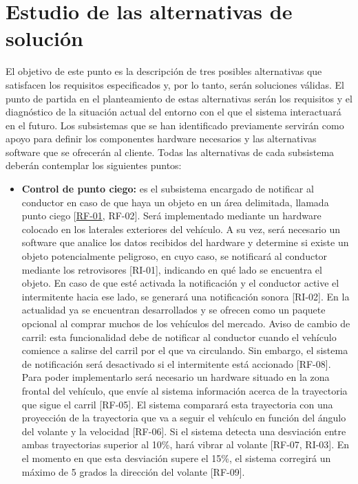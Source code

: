 \section{Estudio de las alternativas de solución}
El objetivo de este punto es la descripción de tres posibles alternativas que satisfacen los requisitos especificados y, por lo tanto, serán soluciones válidas. El punto de partida en el planteamiento de estas alternativas serán los requisitos y el diagnóstico de la situación actual del entorno con el que el sistema interactuará en el futuro. Los subsistemas que se han identificado previamente servirán como apoyo para definir los componentes hardware necesarios y las alternativas software que se ofrecerán al cliente. Todas las alternativas de cada subsistema deberán contemplar los siguientes puntos:

\begin{itemize}[-]
\item \textbf{Control de punto ciego:} es el subsistema encargado de notificar al conductor en caso de que haya un objeto en un área delimitada, llamada punto ciego [\hyperref[tab:RF-01]{RF-01}, RF-02]. Será implementado mediante un hardware colocado en los laterales exteriores del vehículo. A su vez, será necesario un software que analice los datos recibidos del hardware y determine si existe un objeto potencialmente peligroso, en cuyo caso, se notificará al conductor mediante los retrovisores [RI-01], indicando en qué lado se encuentra el objeto. En caso de que esté activada la notificación y el conductor active el intermitente hacia ese lado, se generará una notificación sonora [RI-02]. En la actualidad ya se encuentran desarrollados y se ofrecen como un paquete opcional al comprar muchos de los vehículos del mercado.
Aviso de cambio de carril: esta funcionalidad debe de notificar al conductor cuando el vehículo comience a salirse del carril por el que va circulando. Sin embargo, el sistema de notificación será desactivado si el intermitente está accionado [RF-08]. Para poder implementarlo será necesario un hardware situado en la zona frontal del vehículo, que envíe al sistema información acerca de la trayectoria que sigue el carril [RF-05].  El sistema comparará esta trayectoria con una proyección de la trayectoria que va a seguir el vehículo en función del ángulo del volante y la velocidad [RF-06]. Si el sistema detecta una desviación entre ambas trayectorias superior al 10\%, hará vibrar al volante [RF-07, RI-03]. En el momento en que esta desviación supere el 15\%, el sistema corregirá un máximo de 5 grados la dirección del volante [RF-09].

\end{itemize}
